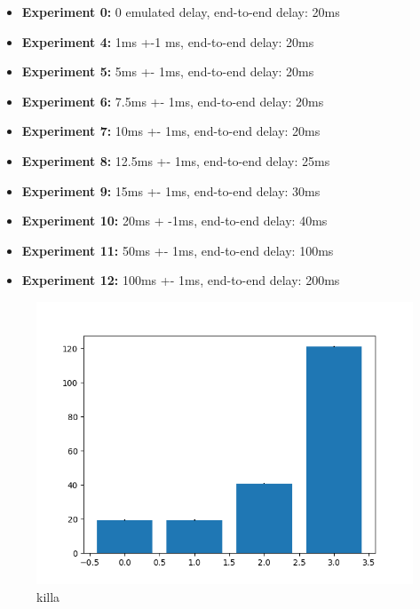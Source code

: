 \documentclass[conference]{IEEEtran}
\begin{document}
\begin{itemize}
\item \textbf{Experiment 0:} 0 emulated delay, end-to-end delay: 20ms
\item \textbf{Experiment 4:} 1ms +-1 ms, end-to-end delay: 20ms
\item \textbf{Experiment 5:} 5ms +- 1ms, end-to-end delay: 20ms
\item \textbf{Experiment 6:} 7.5ms +- 1ms, end-to-end delay: 20ms
\item \textbf{Experiment 7:} 10ms +- 1ms, end-to-end delay: 20ms
\item \textbf{Experiment 8:} 12.5ms +- 1ms, end-to-end delay: 25ms
\item \textbf{Experiment 9:} 15ms +- 1ms, end-to-end delay: 30ms
\item \textbf{Experiment 10:} 20ms + -1ms, end-to-end delay: 40ms
\item \textbf{Experiment 11:} 50ms +- 1ms, end-to-end delay: 100ms
\item \textbf{Experiment 12:} 100ms +- 1ms, end-to-end delay: 200ms
\end{itemize}



\begin{figure}
    \centering
    \includegraphics[scale=0.6]{graphics/plt}
    \caption{killa}
\end{figure}
\end{document}
